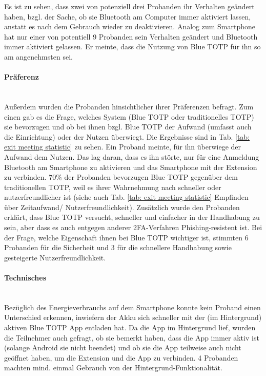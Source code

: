 Es ist zu sehen, dass zwei von potenziell drei Probanden ihr Verhalten geändert 
haben, bzgl. der Sache, ob sie Bluetooth am Computer immer aktiviert lassen, 
anstatt es nach dem Gebrauch wieder zu deaktivieren. Analog zum Smartphone hat nur 
einer von potentiell 9 Probanden sein Verhalten geändert und Bluetooth immer 
aktiviert gelassen. Er meinte, dass die Nutzung von Blue TOTP für ihn so am 
angenehmsten sei.

\paragraph*{Präferenz}
\mbox{} \vspace{0.1cm} \\
Außerdem wurden die Probanden hinsichtlicher ihrer Präferenzen befragt. Zum einen 
gab es die Frage, welches System (Blue TOTP oder traditionelles TOTP) sie 
bevorzugen und ob bei ihnen bzgl. Blue TOTP der Aufwand (umfasst auch die 
Einrichtung) oder der Nutzen überwiegt. Die Ergebnisse sind in 
Tab. \ref{tab: exit meeting statistic} zu sehen. Ein Proband meinte, für ihn überwiege der Aufwand dem 
Nutzen. Das lag daran, dass es ihn störte, nur für eine Anmeldung Bluetooth am 
Smartphone zu aktivieren und das Smartphone mit der Extension zu verbinden. $70\%$ 
der Probanden bevorzugen Blue TOTP gegenüber dem traditionellen TOTP, weil es ihrer 
Wahrnehmung nach schneller oder nutzerfreundlicher ist (siehe auch 
Tab. \ref{tab: exit meeting statistic} \glqq Empfinden über Zeitaufwand/
Nutzerfreundlichkeit\grqq{}). Zusätzlich wurde den Probanden erklärt, dass Blue 
TOTP versucht, schneller und einfacher in der Handhabung zu sein, aber dass es auch 
entgegen anderer 2FA-Verfahren Phishing-resistent ist. Bei der Frage, welche 
Eigenschaft ihnen bei Blue TOTP wichtiger ist, stimmten 6 Probanden für die 
Sicherheit und 3 für die schnellere Handhabung sowie gesteigerte 
Nutzerfreundlichkeit.

\paragraph*{Technisches}
\mbox{} \vspace{0.1cm} \\
Bezüglich des Energieverbrauchs auf dem Smartphone konnte kein Proband einen 
Unterschied erkennen, inwiefern der Akku sich schneller mit der (im Hintergrund) aktiven Blue TOTP App 
entladen hat. Da die App im Hintergrund lief, wurden die Teilnehmer auch gefragt, 
ob sie bemerkt haben, dass die App immer aktiv ist (solange Android sie nicht 
beendet) und ob sie die App teilweise auch nicht geöffnet haben, um die Extension 
und die App zu verbinden. 4 Probanden machten mind. einmal Gebrauch von der  
Hintergrund-Funktionalität.

